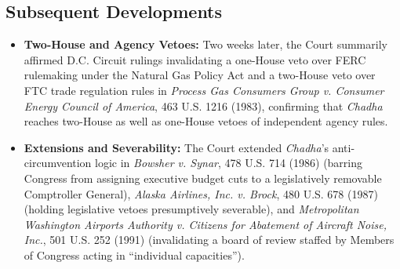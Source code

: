 \documentclass[12pt]{article}
\begin{document}
\subsection{Subsequent Developments}

\begin{itemize}

\item \textbf{Two-House and Agency Vetoes:} Two weeks later, the Court summarily affirmed D.C. Circuit rulings invalidating a one-House veto over FERC rulemaking under the Natural Gas Policy Act and a two-House veto over FTC trade regulation rules in \textit{Process Gas Consumers Group v. Consumer Energy Council of America}, 463 U.S. 1216 (1983), confirming that \textit{Chadha} reaches two-House as well as one-House vetoes of independent agency rules.

\item \textbf{Extensions and Severability:} The Court extended \textit{Chadha}'s anti-circumvention logic in \textit{Bowsher v. Synar}, 478 U.S. 714 (1986) (barring Congress from assigning executive budget cuts to a legislatively removable Comptroller General), \textit{Alaska Airlines, Inc. v. Brock}, 480 U.S. 678 (1987) (holding legislative vetoes presumptively severable), and \textit{Metropolitan Washington Airports Authority v. Citizens for Abatement of Aircraft Noise, Inc.}, 501 U.S. 252 (1991) (invalidating a board of review staffed by Members of Congress acting in ``individual capacities'').

\end{itemize}
\end{document}
